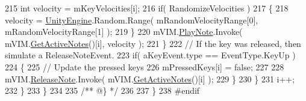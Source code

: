 \begin{DoxyCodeInclude}
215                     \textcolor{keywordtype}{int} velocity = mKeyVelocities[i];
216                     \textcolor{keywordflow}{if}( RandomizeVelocities )
217                     \{
218                         velocity = \hyperlink{namespace_unity_engine}{UnityEngine}.Random.Range( mRandomVelocityRange[0], 
      mRandomVelocityRange[1] );
219                     \}
220                     mVIM.\hyperlink{group___v_i_m_events_gaa21021c13a8c9d13cbf374d5bf9d68fa}{PlayNote}.Invoke( mVIM.\hyperlink{group___v_i_m_pub_func_ga119e0c582106fc9ecc2631e39d71d681}{GetActiveNotes}()[i], velocity );
221                 \}
222                 \textcolor{comment}{// If the key was released, then simulate a ReleaseNoteEvent.}
223                 \textcolor{keywordflow}{if}( aKeyEvent.type == EventType.KeyUp )
224                 \{
225                     \textcolor{comment}{// Update the pressed keys}
226                     mPressedKeys[i] = \textcolor{keyword}{false};
227 
228                     mVIM.\hyperlink{group___v_i_m_events_ga3a1726a6366126421434c2c7be5e5678}{ReleaseNote}.Invoke( mVIM.\hyperlink{group___v_i_m_pub_func_ga119e0c582106fc9ecc2631e39d71d681}{GetActiveNotes}()[i] );
229                 \}
230             \}
231             i++;
232         \}
233     \}
234 \textcolor{comment}{}
235 \textcolor{comment}{    /** @\} */}
236 
237 \}
238 \textcolor{preprocessor}{#endif}
\end{DoxyCodeInclude}
 